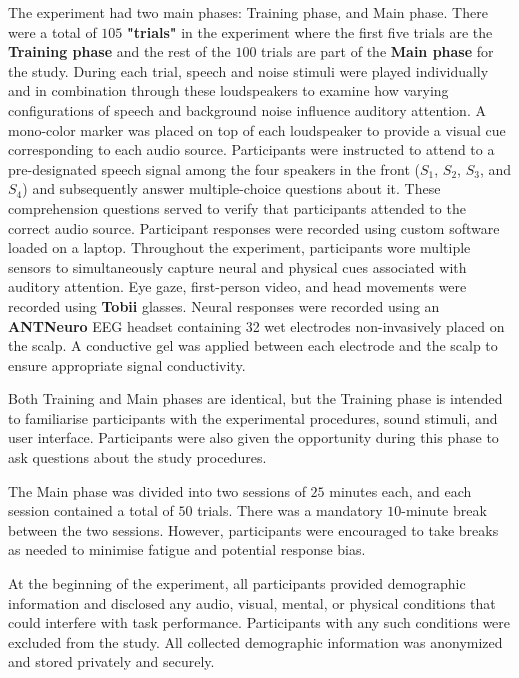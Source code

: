 \documentclass{article}
\begin{document}
The experiment had two main phases: Training phase, and Main phase. There were a total of $105$ \textbf{"trials"} in the experiment where the first five trials are the \textbf{Training phase} and the rest of the $100$ trials are part of the \textbf{Main phase} for the study. During each trial, speech and noise stimuli were played individually and in combination through these loudspeakers to examine how varying configurations of speech and background noise influence auditory attention. A mono-color marker was placed on top of each loudspeaker to provide a visual cue corresponding to each audio source. Participants were instructed to attend to a pre-designated speech signal among the four speakers in the front ($S_1$, $S_2$, $S_3$, and $S_4$) and subsequently answer multiple-choice questions about it. These comprehension questions served to verify that participants attended to the correct audio source. Participant responses were recorded using custom software loaded on a laptop. Throughout the experiment, participants wore multiple sensors to simultaneously capture neural and physical cues associated with auditory attention. Eye gaze, first-person video, and head movements were recorded using \textbf{Tobii} glasses. Neural responses were recorded using an \textbf{ANTNeuro} EEG headset containing 32 wet electrodes non-invasively placed on the scalp. A conductive gel was applied between each electrode and the scalp to ensure appropriate signal conductivity.


Both Training and Main phases are identical, but the Training phase is intended to familiarise participants with the experimental procedures, sound stimuli, and user interface. Participants were also given the opportunity during this phase to ask questions about the study procedures.


The Main phase was divided into two sessions of $25$ minutes each, and each session contained a total of $50$ trials. There was a mandatory $10$-minute break between the two sessions. However, participants were encouraged to take breaks as needed to minimise fatigue and potential response bias.

At the beginning of the experiment, all participants provided demographic information and disclosed any audio, visual, mental, or physical conditions that could interfere with task performance. Participants with any such conditions were excluded from the study. All collected demographic information was anonymized and stored privately and securely.
\end{document}

